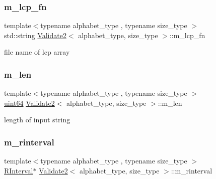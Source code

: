\subsubsection{\texorpdfstring{m\+\_\+lcp\+\_\+fn}{m\_lcp\_fn}}
{\footnotesize\ttfamily template$<$typename alphabet\+\_\+type , typename size\+\_\+type $>$ \\
std\+::string \hyperlink{class_validate2}{Validate2}$<$ alphabet\+\_\+type, size\+\_\+type $>$\+::m\+\_\+lcp\+\_\+fn\hspace{0.3cm}{\ttfamily [private]}}



file name of lcp array 

\mbox{\label{class_validate2_a64e02ffca40be106951a2325bc9d24e6}} 
\subsubsection{\texorpdfstring{m\+\_\+len}{m\_len}}
{\footnotesize\ttfamily template$<$typename alphabet\+\_\+type , typename size\+\_\+type $>$ \\
\hyperlink{types_8h_a60e8696a4678cd348e991a1f172e53f7}{uint64} \hyperlink{class_validate2}{Validate2}$<$ alphabet\+\_\+type, size\+\_\+type $>$\+::m\+\_\+len\hspace{0.3cm}{\ttfamily [private]}}



length of input string 

\mbox{\label{class_validate2_a1beb0a916dd1ad049b3b59f5058c5bb4}} 
\subsubsection{\texorpdfstring{m\+\_\+rinterval}{m\_rinterval}}
{\footnotesize\ttfamily template$<$typename alphabet\+\_\+type , typename size\+\_\+type $>$ \\
\hyperlink{struct_validate2_1_1_r_interval}{R\+Interval}$\ast$ \hyperlink{class_validate2}{Validate2}$<$ alphabet\+\_\+type, size\+\_\+type $>$\+::m\+\_\+rinterval\hspace{0.3cm}{\ttfamily [private]}}



